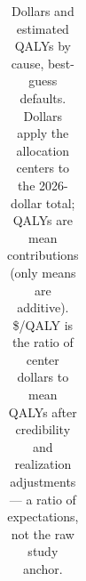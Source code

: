 \documentclass[
  11pt,
  letterpaper,
  DIV=11,
  numbers=noendperiod]{scrartcl}
\begin{document}
{

\begin{longtable}[]{@{}
  >{\raggedright\arraybackslash}p{}
  >{\raggedright\arraybackslash}p{}
  >{\raggedright\arraybackslash}p{}
  >{\raggedleft\arraybackslash}p{}
  >{\raggedright\arraybackslash}p{}
  >{\raggedright\arraybackslash}p{}
  >{\raggedright\arraybackslash}p{}@{}}

\caption{\label{tbl-cause}Dollars and estimated QALYs by cause,
best-guess defaults. Dollars apply the allocation centers to the
2026-dollar total; QALYs are mean contributions (only means are
additive). \$/QALY is the ratio of center dollars to mean QALYs after
credibility and realization adjustments --- a ratio of expectations, not
the raw study anchor.}

\tabularnewline


\end{longtable}}
\end{document}
